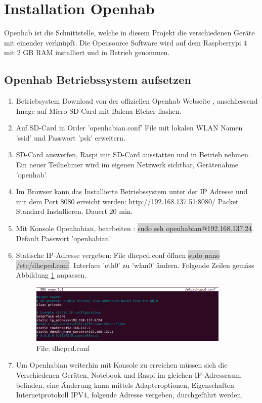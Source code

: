 \clearpage
\section{Installation Openhab}\label{sec:Openhab}
Openhab ist die Schnittstelle, welche in diesem Projekt die verschiedenen Geräte mit einender verknüpft. Die Opensource Software wird auf dem Raspberrypi 4 mit 2 GB RAM installiert und in Betrieb genommen. 

\subsection{Openhab Betriebssystem aufsetzen}
\begin{enumerate}
	\item Betriebsystem Download von der offiziellen Openhab Webseite \cite{noauthor_download_nodate-1}, anschliessend Image auf Micro SD-Card mit Balena Etcher flashen.
   \item Auf SD-Card in Order 'openhabian.conf' File mit lokalen WLAN Namen 'ssid' und Passwort 'psk' erweitern.
   \item SD-Card auswerfen, Raspi mit SD-Card ausstatten und in Betrieb nehmen. Ein neuer Teilnehmer wird im eigenen Netzwerk sichtbar, Gerätenahme 'openhab'.
   \item Im Browser kann das Installierte Betriebssystem unter der IP Adresse und mit dem Port 8080 erreicht werden: http://192.168.137.51:8080/ Packet Standard Installieren. Dauert 20 min.
   \item Mit Konsole Openhabian, bearbeiten : \colorbox{lightgray}{sudo ssh openhabian@192.168.137.24}. \\
   Default Passwort 'openhabian'
   \item Statische IP-Adresse vergeben: File dhcpcd.conf öffnen \colorbox{lightgray}{sudo nano /etc/dhcpcd.conf}. Interface 'eth0' zu 'wlan0' ändern. Folgende Zeilen gemäss Abbildung \ref{pic: dhcpcd} anpassen. 
   \begin{figure}[H]
   	\centering
   	\includegraphics[width=0.9\textwidth]{graphics/dhcpcd.png}
   	\caption{File: dhcpcd.conf} 	
   	\label{pic: dhcpcd}
   \end{figure} 
\item Um Openhabian weiterhin mit Konsole zu erreichen müssen sich die Verschiedenen Geräten, Notebook und Raspi im gleichen IP-Adressraum befinden, eine Änderung kann mittels Adapteroptionen, Eigenschaften Internetprotokoll IPV4, folgende Adresse vergeben, durchgeführt werden.


\end{enumerate}
